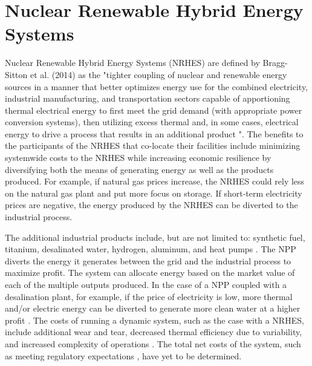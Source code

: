 \documentclass[12pt]{UIdahoMastersThesis}
\begin{document}
\section{Nuclear Renewable Hybrid Energy Systems}
Nuclear Renewable Hybrid Energy Systems (NRHES) are defined by Bragg-Sitton et al. (2014) as the "tighter coupling of nuclear and renewable energy sources in a manner that better optimizes energy use for the combined electricity, industrial manufacturing, and transportation sectors capable of apportioning thermal electrical energy to first meet the grid demand (with appropriate power conversion systems), then utilizing excess thermal and, in some cases, electrical energy to drive a process that results in an additional product \cite {Bragg-Sitton2014}".  The benefits to the participants of the NRHES that co-locate their facilities include minimizing systemwide costs to the NRHES while increasing economic resilience by diversifying both the means of generating energy as well as the products produced. For example, if natural gas prices increase, the NRHES could rely less on the natural gas plant and put more focus on storage.  If short-term electricity prices are negative, the energy produced by the NRHES can be diverted to the industrial process.

The additional industrial products include, but are not limited to: synthetic fuel, titanium, desalinated water, hydrogen, aluminum, and heat pumps \cite{Bienvenue2015}. The NPP diverts the energy it generates between the grid and the industrial process to maximize profit. The system can allocate energy based on the market value of each of the multiple outputs produced. In the case of a NPP coupled with a desalination plant, for example, if the price of electricity is low, more thermal and/or electric energy can be diverted to generate more clean water at a higher profit \cite {Chen2016}. The costs of running a dynamic system, such as the case with a NRHES, include additional wear and tear, decreased thermal efficiency  due to variability, and increased complexity of operations  \cite{Garcia2013}. The total net costs of the system, such as meeting regulatory expectations , have yet to be determined.
\end{document}
